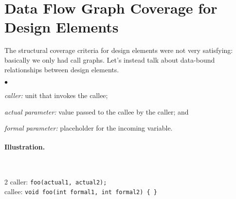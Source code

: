 \documentclass[11pt]{article}
\newcommand{\squishlist}{
 \begin{list}{$\bullet$}
  { \setlength{\itemsep}{0pt}
     \setlength{\parsep}{3pt}
     \setlength{\topsep}{3pt}
     \setlength{\partopsep}{0pt}
     \setlength{\leftmargin}{1.5em}
     \setlength{\labelwidth}{1em}
     \setlength{\labelsep}{0.5em} } }
\newcommand{\squishend}{
  \end{list}  }
\begin{document}
\vspace*{-1em}
\section*{Data Flow Graph Coverage for Design Elements}
\vspace*{-1em}

The structural coverage criteria for design elements were not very
satisfying: basically we only had call graphs. Let's instead
talk about data-bound relationships between design elements.

\squishlist
\item \emph{caller:} unit that invokes the callee;
\item \emph{actual parameter:} value passed to the callee by the caller; and
\item \emph{formal parameter:} placeholder for the incoming variable.
\squishend

\vspace*{-1em}
\paragraph{Illustration.} ~\\[-1em]

\begin{multicols}{2}{
caller:
\verb+foo(actual1, actual2);+
  }
  ~\\
{
callee:\vspace*{-1em}
\verb+void foo(int formal1, int formal2) { }+
}
\end{multicols}
\end{document}
